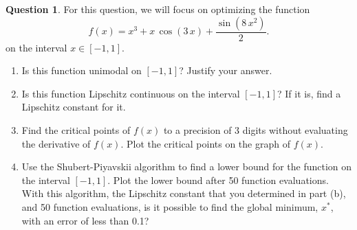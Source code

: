 \documentclass{article}
\theoremstyle{definition}
\newtheorem{question}[thm]{Question}
\begin{document}
\begin{question}
    For this question, we will focus on optimizing the function $$f(x) = x^3 + x\,\cos\left(3\,x\right) + \frac{\sin \left(8\,x^2 \right)}{2}\text{.}$$ on the interval $x \in [-1, 1]$.
    \begin{enumerate}[label=(\alph*)]
        \item Is this function unimodal on $[-1, 1]$? Justify your answer.
        \item Is this function Lipschitz continuous on the interval $[-1, 1]$? If it is, find a Lipschitz constant for it.
        \item Find the critical points of $f(x)$ to a precision of 3 digits without evaluating the derivative of $f(x)$. Plot the critical points on the graph of $f(x)$.
        \item Use the Shubert-Piyavskii algorithm to find a lower bound for the function on the interval $[-1, 1]$. Plot the lower bound after 50 function evaluations. With this algorithm, the Lipschitz constant that you determined in part (b), and 50 function evaluations, is it possible to find the global minimum, $x^*$, with an error of less than 0.1?
    \end{enumerate}
\end{question}
\end{document}
